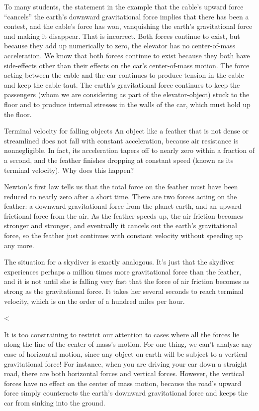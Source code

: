 \enlargethispage{\baselineskip}

To many students, the statement in the example that the
cable's upward force ``cancels'' the earth's downward
gravitational force implies that there has been a contest,
and the cable's force has won, vanquishing the earth's
gravitational force and making it disappear. That is
incorrect. Both forces continue to exist, but because they
add up numerically to zero, the elevator has no center-of-mass
acceleration. We know that both forces continue to exist
because they both have side-effects other than their effects
on the car's center-of-mass motion. The force acting between
the cable and the car continues to produce tension in the
cable and keep the cable taut. The earth's gravitational
force continues to keep the passengers (whom we are
considering as part of the elevator-object) stuck to the
floor and to produce internal stresses in the walls of the
car, which must hold up the floor.

\begin{eg}{Terminal velocity for falling objects}
\egquestion An object like a feather that is not dense or
streamlined does not fall with constant acceleration,
because air resistance is nonnegligible. In fact, its
acceleration tapers off to nearly zero within a fraction of
a second, and the feather finishes dropping at constant
speed (known as its terminal velocity). Why does this happen?

\eganswer Newton's first law tells us that the total force on
the feather must have been reduced to nearly zero after a
short time. There are two forces acting on the feather: a
downward gravitational force from the planet earth, and an
upward frictional force from the air. As the feather speeds
up, the air friction becomes stronger and stronger, and
eventually it cancels out the earth's gravitational force,
so the feather just continues with constant velocity without
speeding up any more.

    The situation for a skydiver is exactly analogous. It's
just that the skydiver experiences perhaps a million times
more gravitational force than the feather, and it is not
until she is falling very fast that the force of air
friction becomes as strong as the gravitational force. It
takes her several seconds to reach terminal velocity, which
is on the order of a hundred miles per hour.
\end{eg}

<%

It is too constraining to restrict our attention to cases
where all the forces lie along the line of the center of
mass's motion. For one thing, we can't analyze any case of
horizontal motion, since any object on earth will be subject
to a vertical gravitational force! For instance, when you
are driving your car down a straight road, there are both
horizontal forces and vertical forces. However, the vertical
forces have no effect on the center of mass motion, because
the road's upward force simply counteracts the earth's
downward gravitational force and keeps the car from
sinking into the ground.

